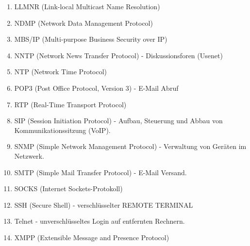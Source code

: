 \documentclass[11pt]{article}
\begin{document}
\begin{enumerate}
\begin{addmargin}[1em]{1em}
\begin{enumerate}
                \item LLMNR (Link-local Multicast Name Resolution)\\

                \item NDMP (Network Data Management Protocol)\\

                \item MBS/IP (Multi-purpose Business Security over IP)\\

                \item NNTP (Network News Transfer Protocol) - Diskussionsforen (Usenet)\\

                \item NTP (Network Time Protocol)\\

                \item POP3 (Post Office Protocol, Version 3) - E-Mail Abruf\\

                \item RTP (Real-Time Transport Protocol)\\

                \item SIP (Session Initiation Protocol) - Aufbau, Steuerung und Abbau von
                Kommunikationssitzung (VoIP).\\

                \item SNMP (Simple Network Management Protocol) - Verwaltung von Geräten im Netzwerk.\\

                \item SMTP (Simple Mail Transfer Protocol) - E-Mail Versand.\\

                \item SOCKS (Internet Sockets-Protokoll)\\

                \item SSH (Secure Shell) - verschlüsselter REMOTE TERMINAL\\

                \item Telnet - unverschlüsseltes Login auf entfernten Rechnern.\\

                \item XMPP (Extensible Message and Presence Protocol)\\


\end{enumerate}
\end{addmargin}
\end{enumerate}
\end{document}
